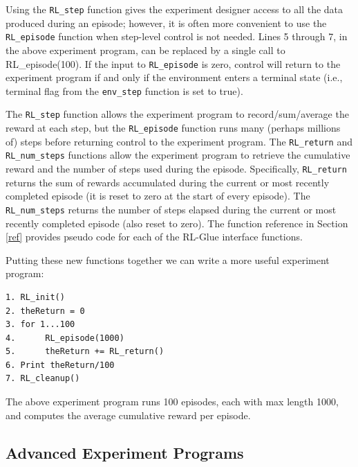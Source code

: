 \documentclass[11pt]{article}
\begin{document}
Using the \texttt{RL\_step} function gives the experiment designer access to all the data produced during an episode; however, it is often more convenient to use the \texttt{RL\_episode} function when step-level control is not needed. Lines 5 through 7, in the above experiment program, can be replaced by a single call to RL\_episode(100). If the input to \texttt{RL\_episode} is zero, control will return to the experiment program if and only if the environment enters a terminal state (i.e., terminal flag from the \texttt{env\_step} function is set to true).

The \texttt{RL\_step} function allows the experiment program to record/sum/average the reward at each step, but the \texttt{RL\_episode} function runs many (perhaps millions of) steps before returning control to the experiment program. The \texttt{RL\_return} and \texttt{RL\_num\_steps} functions allow the experiment program to retrieve the cumulative reward and the number of steps used during the episode. Specifically, \texttt{RL\_return} returns the sum of rewards accumulated during the current or most recently completed episode (it is reset to zero at the start of every episode). The \texttt{RL\_num\_steps} returns the number of steps elapsed during the current or most recently completed episode (also reset to zero). The function reference in Section \ref{ref} provides pseudo code for each of the RL-Glue interface functions.

Putting these new functions together we can write a more useful experiment program:
\begin{verbatim}
1. RL_init()
2. theReturn = 0
3. for 1...100
4.      RL_episode(1000)
5.      theReturn += RL_return()
6. Print theReturn/100
7. RL_cleanup()
\end{verbatim}
The above experiment program runs 100 episodes, each with max length 1000, and computes the average cumulative reward per episode.

\subsection{Advanced Experiment Programs}
\label{expp2}


% 
\end{document}
